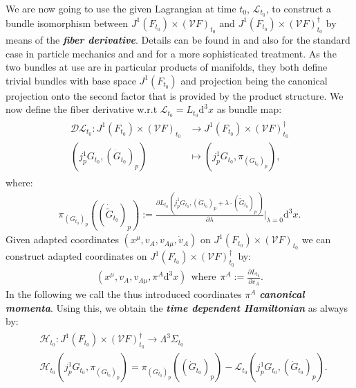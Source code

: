 We are now going to use the given Lagrangian at time $t_0$, $\mathcal{L}_{t_0}$, to construct a bundle isomorphism between $J^1(F_{t_0}) \times (\mathcal{V}F)_{t_0}$ and $J^1(F_{t_0}) \times (\mathcal{V}F)_{t_0}^{\dagger}$ by means of the \textit{\textbf{fiber derivative}}. Details can be found in \cite{abraham2008foundations} and also \cite{FiberDer} for the standard case in particle mechanics and \cite{2000RpMP...45...67G} and \cite{AIF_1973__23_1_203_0} for a more sophisticated treatment.
As the two bundles at use are in particular products of manifolds, they both define trivial bundles with base space $J^1(F_{t_0})$ and projection being the canonical projection onto the second factor that is provided by the product structure. We now define the fiber derivative w.r.t $\mathcal{L}_{t_0} = L_{t_0}\mathrm{d}^3x$ as bundle map:
\begin{align}
\begin{aligned}
    \mathcal{D}\mathcal{L}_{t_0} : J^1(F_{t_0}) \times (\mathcal{V}F)_{t_0} &\longrightarrow J^1(F_{t_0}) \times (\mathcal{V}F)_{t_0}^{\dagger}\\
    (j^1_pG_{t_0},(\dot{G}_{t_0})_p) &\longmapsto (j^1_pG_{t_0},\pi_{(G_{t_0})_p}), 
\end{aligned}
\end{align}
where:
\begin{align}
\pi_{(G_{t_0})_p}((\dot{\widetilde{G}}_{t_0})_p) := \frac{\partial L_{t_0}(j_p^1G_{t_0}, (\dot{G}_{t_0})_p+\lambda \cdot (\dot{\widetilde{G}}_{t_0})_p)}{\partial \lambda } \bigg \vert _{\lambda = 0}\mathrm{d}^3x.
\end{align}
Given adapted coordinates $(x^{\mu},v_A, v_{A\mu}, \dot{v}_A)$ on $J^1(F_{t_0}) \times (\mathcal{V}F)_{t_0}$ we can construct adapted coordinates on $J^1(F_{t_0}) \times (\mathcal{V}F)_{t_0}^{\dagger}$ by:
\begin{align}
(x^\mu,v_A,v_{A\mu},\pi^A\mathrm{d}^3x) \ \ \text{where} \ \ \pi^A := \frac{\partial L_{t_0}}{\partial \dot{v}_A}.
\end{align}
In the following we call the thus introduced coordinates $\pi^A$ \textit{\textbf{canonical momenta}}.
Using this, we obtain the \textit{\textbf{time dependent Hamiltonian}} as always by:
\begin{align}\label{Ham}
\begin{aligned}
&\mathcal{H}_{t_0} : J^1(F_{t_0}) \times (\mathcal{V}F)_{t_0}^{\dagger} \longrightarrow \Lambda^3\Sigma_{t_0} \\
    &\mathcal{H}_{t_0}(j^1_pG_{t_0},\pi_{(G_{t_0})_p}) = \pi_{(G_{t_0})_p}((\dot{G}_{t_0})_p) - \mathcal{L}_{t_0}(j^1_pG_{t_0},(\dot{G}_{t_0})_p). 
\end{aligned}
\end{align}

